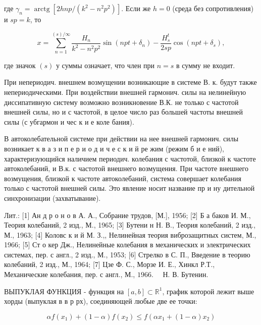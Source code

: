 \documentclass[10pt]{article}
\begin{document}
где $\gamma_{n}=\operatorname{arctg}\left[2 h n p /\left(k^{2}-n^{2} p^{2}\right)\right]$. Если же $h=0$ (среда без сопротивления) и $s p=k$, то



\[

x=\sum_{n=1}^{(s) / \infty} \frac{H_{n}}{k^{2}-n^{2} p^{2}} \sin \left(n p t+\delta_{n}\right)-\frac{H_{s}^{t}}{2 s p} \cos \left(n p t+\delta_{s}\right),

\]



где значок $(s)$ у суммы означает, что член при $n=s$ в сумму не входит.



При непериодич. внешнем возмущении возникающие в системе В. к. будут также непериодическими. При воздействии внешней гармонич. силы на нелинейную диссипативную систему возможно возникновение В.К. не только с частотой внешней силы, но и с частотой, в целое число раз большей частоты внешней силы (с убгармон и чес к и е коле бания).



В автоколебательной системе при действии на нее внешней гармонич. силы возникает к в а з и п е р и о д и ч е с к и й ре жим (режим б и е ний), характеризующийся наличием периодич. колебания с частотой, близкой к частоте автоколебаний, и В.к. с частотой внешнего возмущения. При частоте внешнего возмущения, близкой к частоте автоколебаний, система совершает колебания только с частотой внешней силы. Это явление носит название пр и ну дительной синхронизации (захватывание).



Лит.: [1] Ан д р о н о в А. А., Собрание трудов, [М.], 1956; [2] Б а баков И. М., Теория колебаний, 2 изд., М., 1965; [3] Бутени н Н. В., Теория колебаний, 2 изд., М., 1963; [4] Коловс к и й М. З.,, Нелинейная теория виброзащитных систем, М., 1966; [5] Ст о кер Дж., Нелинейные колебания в механических и электрических системах, пер. с англ., 2 изд., М., 1953; [6] Стрелко в С. П., Введение в теорию колебаний, 2 изд., М., 1964; [7] Цзе Ф. С., Морзе И. Е., Хинкл Р.Т., Механические колебания, пер. с англ., М., $1966 . \quad$ Н. В. Бутенин.



ВЫПУКЛАЯ ФУНКЦИЯ - функция на $[a, b] \subset \mathbb{R}^{1}$, график которой лежит выше хорды (выпуклая в в р рх), соединяющей любые две ее точки:



\[

\alpha f\left(x_{1}\right)+(1-\alpha) f\left(x_{2}\right) \leqslant f\left(\alpha x_{1}+(1-\alpha) x_{2}\right)

\]
\end{document}
